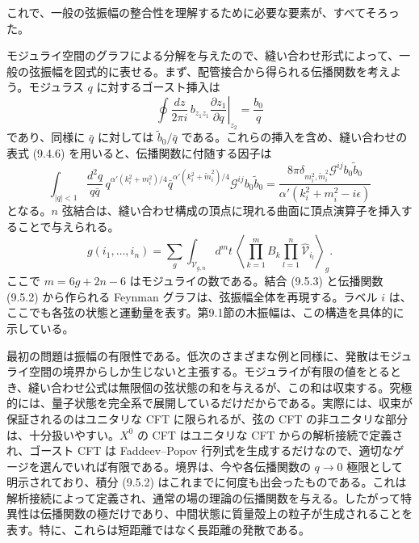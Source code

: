 \label{sec:9.5}

これで、一般の弦振幅の整合性を理解するために必要な要素が、すべてそろった。

モジュライ空間のグラフによる分解を与えたので、縫い合わせ形式によって、一般の弦振幅を図式的に表せる。まず、配管接合から得られる伝播関数を考えよう。モジュラス $q$ に対するゴースト挿入は
\begin{equation}
\oint\frac{dz}{2\pi i}\,b_{z_1z_1}
\left.\frac{\partial z_1}{\partial q}\right|_{z_2}
=\frac{b_0}{q}
\tag{9.5.1}\label{eq:9.5.1}
\end{equation}
であり、同様に $\bar q$ に対しては $\widetilde b_0/\bar q$ である。これらの挿入を含め、縫い合わせの表式 (9.4.6) を用いると、伝播関数に付随する因子は
\begin{equation}
\int_{|q|<1}\frac{d^2q}{q\bar q}\,
q^{\alpha'(k_i^2+m_i^2)/4}
\bar q^{\alpha'(k_i^2+\widetilde m_i^2)/4}
\mathcal G^{ij}b_0\widetilde b_0
=\frac{8\pi\delta_{m_i^2,\widetilde m_i^2}\mathcal G^{ij}b_0\widetilde b_0}
{\alpha'(k_i^2+m_i^2-i\epsilon)}
\tag{9.5.2}\label{eq:9.5.2}
\end{equation}
となる。$n$ 弦結合は、縫い合わせ構成の頂点に現れる曲面に頂点演算子を挿入することで与えられる。
\begin{equation}
g(i_1,\ldots,i_n)=\sum_g\int_{\mathcal V_{g,n}}d^mt\,
\left\langle\prod_{k=1}^{m}B_k
\prod_{l=1}^{n}\widehat{\mathcal V}_{i_l}\right\rangle_g.
\tag{9.5.3}\label{eq:9.5.3}
\end{equation}
ここで $m=6g+2n-6$ はモジュライの数である。結合 (9.5.3) と伝播関数 (9.5.2) から作られる Feynman グラフは、弦振幅全体を再現する。ラベル $i$ は、ここでも各弦の状態と運動量を表す。第9.1節の木振幅は、この構造を具体的に示している。

最初の問題は振幅の有限性である。低次のさまざまな例と同様に、発散はモジュライ空間の境界からしか生じないと主張する。モジュライが有限の値をとるとき、縫い合わせ公式は無限個の弦状態の和を与えるが、この和は収束する。究極的には、量子状態を完全系で展開しているだけだからである。実際には、収束が保証されるのはユニタリな CFT に限られるが、弦の CFT の非ユニタリな部分は、十分扱いやすい。$X^0$ の CFT はユニタリな CFT からの解析接続で定義され、ゴースト CFT は Faddeev--Popov 行列式を生成するだけなので、適切なゲージを選んでいれば有限である。境界は、今や各伝播関数の $q\to0$ 極限として明示されており、積分 (9.5.2) はこれまでに何度も出会ったものである。これは解析接続によって定義され、通常の場の理論の伝播関数を与える。したがって特異性は伝播関数の極だけであり、中間状態に質量殻上の粒子が生成されることを表す。特に、これらは短距離ではなく長距離の発散である。

